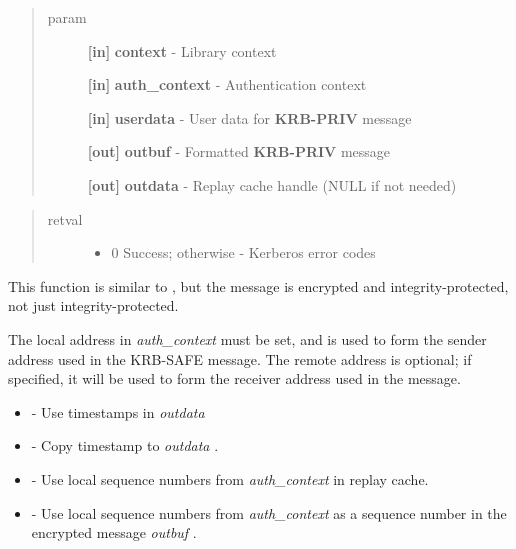 \documentclass[letterpaper,10pt,english]{sphinxmanual}
\begin{document}
\begin{quote}\begin{description}
\item[{param}] \leavevmode
\textbf{{[}in{]}} \textbf{context} - Library context

\textbf{{[}in{]}} \textbf{auth\_context} - Authentication context

\textbf{{[}in{]}} \textbf{userdata} - User data for \textbf{KRB-PRIV} message

\textbf{{[}out{]}} \textbf{outbuf} - Formatted \textbf{KRB-PRIV} message

\textbf{{[}out{]}} \textbf{outdata} - Replay cache handle (NULL if not needed)

\end{description}\end{quote}
\begin{quote}\begin{description}
\item[{retval}] \leavevmode\begin{itemize}
\item {} 
0   Success; otherwise - Kerberos error codes

\end{itemize}

\end{description}\end{quote}

This function is similar to {\hyperref[appdev/refs/api/krb5_mk_safe:krb5_mk_safe]{}} , but the message is encrypted and integrity-protected, not just integrity-protected.

The local address in \emph{auth\_context} must be set, and is used to form the sender address used in the KRB-SAFE message. The remote address is optional; if specified, it will be used to form the receiver address used in the message.
\begin{itemize}
\item {} 
{\hyperref[appdev/refs/macros/KRB5_AUTH_CONTEXT_DO_TIME:KRB5_AUTH_CONTEXT_DO_TIME]{}} - Use timestamps in \emph{outdata}

\item {} 
{\hyperref[appdev/refs/macros/KRB5_AUTH_CONTEXT_RET_TIME:KRB5_AUTH_CONTEXT_RET_TIME]{}} - Copy timestamp to \emph{outdata} .

\item {} 
{\hyperref[appdev/refs/macros/KRB5_AUTH_CONTEXT_DO_SEQUENCE:KRB5_AUTH_CONTEXT_DO_SEQUENCE]{}} - Use local sequence numbers from \emph{auth\_context} in replay cache.

\item {} 
{\hyperref[appdev/refs/macros/KRB5_AUTH_CONTEXT_RET_SEQUENCE:KRB5_AUTH_CONTEXT_RET_SEQUENCE]{}} - Use local sequence numbers from \emph{auth\_context} as a sequence number in the encrypted message \emph{outbuf} .

\end{itemize}
\end{document}
